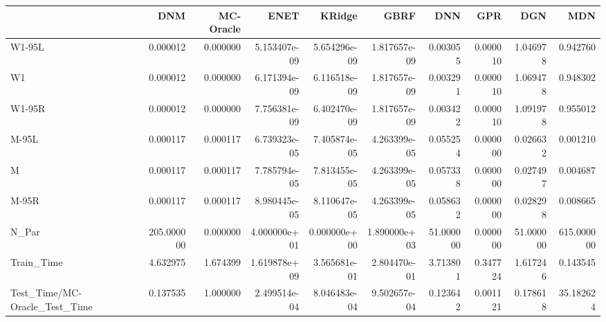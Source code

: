 \begin{tabular}{lrrrrrrrrr}
\toprule
{} &         DNM &  MC-Oracle &          ENET &        KRidge &          GBRF &        DNN &       GPR &        DGN &         MDN \\
\midrule
W1-95L                        &    0.000012 &   0.000000 &  5.153407e-09 &  5.654296e-09 &  1.817657e-09 &   0.003055 &  0.000010 &   1.046978 &    0.942760 \\
W1                            &    0.000012 &   0.000000 &  6.171394e-09 &  6.116518e-09 &  1.817657e-09 &   0.003291 &  0.000010 &   1.069478 &    0.948302 \\
W1-95R                        &    0.000012 &   0.000000 &  7.756381e-09 &  6.402470e-09 &  1.817657e-09 &   0.003422 &  0.000010 &   1.091978 &    0.955012 \\
M-95L                         &    0.000117 &   0.000117 &  6.739323e-05 &  7.405874e-05 &  4.263399e-05 &   0.055254 &  0.000000 &   0.026632 &    0.001210 \\
M                             &    0.000117 &   0.000117 &  7.785794e-05 &  7.813455e-05 &  4.263399e-05 &   0.057338 &  0.000000 &   0.027497 &    0.004687 \\
M-95R                         &    0.000117 &   0.000117 &  8.980445e-05 &  8.110647e-05 &  4.263399e-05 &   0.058632 &  0.000000 &   0.028298 &    0.008665 \\
N\_Par                         &  205.000000 &   0.000000 &  4.000000e+01 &  0.000000e+00 &  1.890000e+03 &  51.000000 &  0.000000 &  51.000000 &  615.000000 \\
Train\_Time                    &    4.632975 &   1.674399 &  1.619878e+09 &  3.565681e-01 &  2.804470e-01 &   3.713801 &  0.347724 &   1.617246 &    0.143545 \\
Test\_Time/MC-Oracle\_Test\_Time &    0.137535 &   1.000000 &  2.499514e-04 &  8.046483e-04 &  9.502657e-04 &   0.123642 &  0.001121 &   0.178618 &   35.182624 \\
\bottomrule
\end{tabular}
